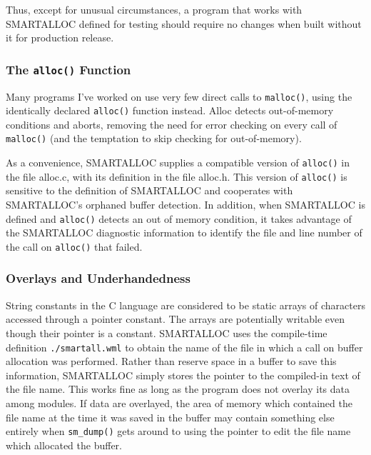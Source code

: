Thus, except for unusual circumstances, a program that works with SMARTALLOC
defined for testing should require no changes when built without it for
production release. 

\subsubsection*{ The {\tt alloc()} Function}

Many programs I've worked on use very few direct calls to {\tt malloc()},
using the identically declared {\tt alloc()} function instead. Alloc detects
out-of-memory conditions and aborts, removing the need for error checking on
every call of {\tt malloc()} (and the temptation to skip checking for
out-of-memory). 

As a convenience, SMARTALLOC supplies a compatible version of {\tt alloc()} in
the file alloc.c, with its definition in the file alloc.h. This version of
{\tt alloc()} is sensitive to the definition of SMARTALLOC and cooperates with
SMARTALLOC's orphaned buffer detection. In addition, when SMARTALLOC is
defined and {\tt alloc()} detects an out of memory condition, it takes
advantage of the SMARTALLOC diagnostic information to identify the file and
line number of the call on {\tt alloc()} that failed. 

\subsubsection*{ Overlays and Underhandedness}

String constants in the C language are considered to be static arrays of
characters accessed through a pointer constant. The arrays are potentially
writable even though their pointer is a constant. SMARTALLOC uses the
compile-time definition {\tt ./smartall.wml} to obtain the name of the file in
which a call on buffer allocation was performed. Rather than reserve space in
a buffer to save this information, SMARTALLOC simply stores the pointer to the
compiled-in text of the file name. This works fine as long as the program does
not overlay its data among modules. If data are overlayed, the area of memory
which contained the file name at the time it was saved in the buffer may
contain something else entirely when {\tt sm\_dump()} gets around to using the
pointer to edit the file name which allocated the buffer. 

